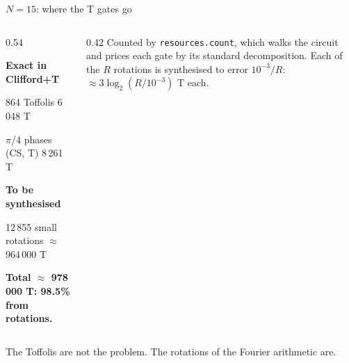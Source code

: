 \documentclass[aspectratio=169,11pt]{beamer}
\newcommand{\blocktitle}[1]{{\bfseries #1}\par\vskip1mm}
\newcommand{\peachtitle}[1]{{\bfseries\color{cverm}#1}\par\vskip1mm}
\begin{document}
\begin{frame}{$N=15$: where the T gates go}
  \begin{columns}[c]
    \begin{column}{0.54\textwidth}
      \begin{greyblock}
        \blocktitle{Exact in Clifford+T}
        864 Toffolis \hfill 6\,048 T\par
        $\pi/4$ phases (CS, T) \hfill 8\,261 T\par
      \end{greyblock}
      \begin{peachblock}
        \peachtitle{To be synthesised}
        12\,855 small rotations \hfill $\approx$ 964\,000 T\par
      \end{peachblock}
      \textbf{Total $\approx$ 978\,000 T: 98.5\% from rotations.}
    \end{column}
    \begin{column}{0.42\textwidth}
      \small
      Counted by \texttt{resources.count}, which walks the circuit and prices each gate by its standard decomposition.
      \vskip2mm
      Each of the $R$ rotations is synthesised to error $10^{-3}/R$: $\approx3\log_2(R/10^{-3})$ T each.
    \end{column}
  \end{columns}
  \begin{takeaway}The Toffolis are not the problem. The rotations of the Fourier arithmetic are.\end{takeaway}
\end{frame}
\end{document}
